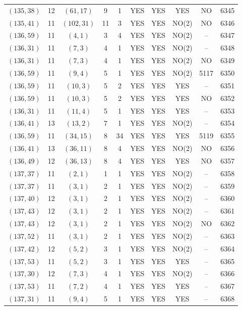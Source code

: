 \begin{longtable}{|c|c|c|c|c|c|c|c|c|c|}
$(135, 38)$ & 12 & $(61, 17)$ & 9 & 1 & YES & YES & YES & NO & 6345\\
$(135, 41)$ & 11 & $(102, 31)$ & 11 & 3 & YES & YES & NO(2) & NO & 6346\\
$(136, 59)$ & 11 & $(4, 1)$ & 3 & 4 & YES & YES & NO(2) & -- & 6347\\
$(136, 31)$ & 11 & $(7, 3)$ & 4 & 1 & YES & YES & NO(2) & -- & 6348\\
$(136, 31)$ & 11 & $(7, 3)$ & 4 & 1 & YES & YES & NO(2) & NO & 6349\\
$(136, 59)$ & 11 & $(9, 4)$ & 5 & 1 & YES & YES & NO(2) & 5117 & 6350\\
$(136, 59)$ & 11 & $(10, 3)$ & 5 & 2 & YES & YES & YES & -- & 6351\\
$(136, 59)$ & 11 & $(10, 3)$ & 5 & 2 & YES & YES & YES & NO & 6352\\
$(136, 31)$ & 11 & $(11, 4)$ & 5 & 1 & YES & YES & YES & -- & 6353\\
$(136, 41)$ & 13 & $(13, 2)$ & 7 & 1 & YES & YES & NO(2) & -- & 6354\\
$(136, 59)$ & 11 & $(34, 15)$ & 8 & 34 & YES & YES & YES & 5119 & 6355\\
$(136, 41)$ & 13 & $(36, 11)$ & 8 & 4 & YES & YES & NO(2) & NO & 6356\\
$(136, 49)$ & 12 & $(36, 13)$ & 8 & 4 & YES & YES & YES & NO & 6357\\
$(137, 37)$ & 11 & $(2, 1)$ & 1 & 1 & YES & YES & NO(2) & -- & 6358\\
$(137, 37)$ & 11 & $(3, 1)$ & 2 & 1 & YES & YES & NO(2) & -- & 6359\\
$(137, 40)$ & 12 & $(3, 1)$ & 2 & 1 & YES & YES & NO(2) & -- & 6360\\
$(137, 43)$ & 12 & $(3, 1)$ & 2 & 1 & YES & YES & NO(2) & -- & 6361\\
$(137, 43)$ & 12 & $(3, 1)$ & 2 & 1 & YES & YES & NO(2) & NO & 6362\\
$(137, 52)$ & 11 & $(3, 1)$ & 2 & 1 & YES & YES & NO(2) & -- & 6363\\
$(137, 42)$ & 12 & $(5, 2)$ & 3 & 1 & YES & YES & NO(2) & -- & 6364\\
$(137, 53)$ & 11 & $(5, 2)$ & 3 & 1 & YES & YES & YES & -- & 6365\\
$(137, 30)$ & 12 & $(7, 3)$ & 4 & 1 & YES & YES & NO(2) & -- & 6366\\
$(137, 53)$ & 11 & $(7, 2)$ & 4 & 1 & YES & YES & YES & -- & 6367\\
$(137, 31)$ & 11 & $(9, 4)$ & 5 & 1 & YES & YES & YES & -- & 6368\\

\end{longtable}
